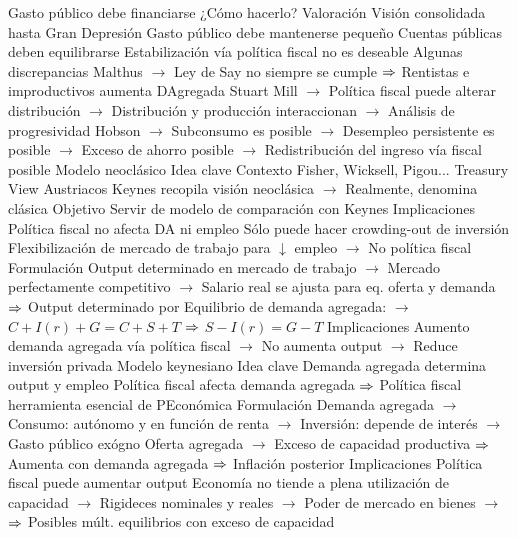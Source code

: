 \documentclass{nuevotema}
\begin{document}
\begin{esquemal}
				\4[] Gasto público debe financiarse
				\4[] ¿Cómo hacerlo?
			\3 Valoración
				\4 Visión consolidada hasta Gran Depresión
				\4[] Gasto público debe mantenerse pequeño
				\4[] Cuentas públicas deben equilibrarse
				\4[] Estabilización vía política fiscal no es deseable
				\4 Algunas discrepancias
				\4[] Malthus
				\4[] $\to$ Ley de Say no siempre se cumple
				\4[] $\Rightarrow$ Rentistas e improductivos aumenta DAgregada
				\4[] Stuart Mill
				\4[] $\to$ Política fiscal puede alterar distribución
				\4[] $\to$ Distribución y producción interaccionan
				\4[] $\to$ Análisis de progresividad
				\4[] Hobson
				\4[] $\to$ Subconsumo es posible
				\4[] $\to$ Desempleo persistente es posible
				\4[] $\to$ Exceso de ahorro posible
				\4[] $\to$ Redistribución del ingreso vía fiscal posible
		\2 Modelo neoclásico
			\3 Idea clave
				\4 Contexto
				\4[] Fisher, Wicksell, Pigou...
				\4[] Treasury View
				\4[] Austriacos
				\4[] Keynes recopila visión neoclásica
				\4[] $\to$ Realmente, denomina clásica
				\4 Objetivo
				\4[] Servir de modelo de comparación con Keynes
				\4 Implicaciones
				\4[] Política fiscal no afecta DA ni empleo
				\4[] Sólo puede hacer crowding-out de inversión
				\4[] Flexibilización de mercado de trabajo para $\downarrow$ empleo
				\4[] $\to$ No política fiscal
				\4 Formulación
				\4 Output determinado en mercado de trabajo
				\4[] $\to$ Mercado perfectamente competitivo
				\4[] $\to$ Salario real se ajusta para eq. oferta y demanda
				\4[] $\Rightarrow$ Output determinado por
				\4 Equilibrio de demanda agregada:
				\4[] $\to$ $C+I(r) + G = C + S + T$
				\4[] $\Rightarrow$ $S - I(r) = G-T$
				\4 Implicaciones
				\4[] Aumento demanda agregada vía política fiscal
				\4[] $\to$ No aumenta output
				\4[] $\to$ Reduce inversión privada
		\2 Modelo keynesiano
			\3 Idea clave
				\4 Demanda agregada determina output y empleo
				\4 Política fiscal afecta demanda agregada
				\4[] $\Rightarrow$ Política fiscal herramienta esencial de PEconómica
			\3 Formulación
				\4 Demanda agregada
				\4[] $\to$ Consumo: autónomo y en función de renta
				\4[] $\to$ Inversión: depende de interés
				\4[] $\to$ Gasto público exógno
				\4 Oferta agregada
				\4[] $\to$ Exceso de capacidad productiva
				\4[] $\Rightarrow$ Aumenta con demanda agregada
				\4[] $\Rightarrow$ Inflación posterior
			\3 Implicaciones
				\4 Política fiscal puede aumentar output
				\4[] Economía no tiende a plena utilización de capacidad
				\4[] $\to$ Rigideces nominales y reales
				\4[] $\to$ Poder de mercado en bienes
				\4[] $\to$
				\4[] $\Rightarrow$
				\4 Posibles múlt. equilibrios con exceso de capacidad

\end{esquemal}
\end{document}
